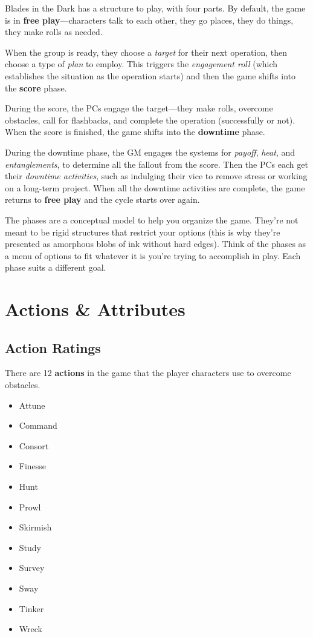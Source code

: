 \documentclass[11pt,oneside]{book}
\begin{document}
Blades in the Dark has a structure to play, with four parts. By default, the game is in \textbf{free play}---characters talk to each other, they go places, they do things, they make rolls as needed.

When the group is ready, they choose a \emph{target} for their next operation, then choose a type of \emph{plan} to employ. This triggers the \emph{engagement roll} (which establishes the situation as the operation starts) and then the game shifts into the \textbf{score} phase.

During the score, the PCs engage the target---they make rolls, overcome obstacles, call for flashbacks, and complete the operation (successfully or not). When the score is finished, the game shifts into the \textbf{downtime} phase.

During the downtime phase, the GM engages the systems for \emph{payoff}, \emph{heat}, and \emph{entanglements}, to determine all the fallout from the score. Then the PCs each get their \emph{downtime activities}, such as indulging their vice to remove stress or working on a long-term project. When all the downtime activities are complete, the game returns to \textbf{free play} and the cycle starts over again.

The phases are a conceptual model to help you organize the game. They’re not meant to be rigid structures that restrict your options (this is why they’re presented as amorphous blobs of ink without hard edges). Think of the phases as a menu of options to fit whatever it is you’re trying to accomplish in play. Each phase suits a different goal.

\chapter{Actions \& Attributes}

\section{Action Ratings}

There are 12 \textbf{actions} in the game that the player characters use to overcome obstacles.

\begin{itemize}
	\item Attune
	\item Command
	\item Consort
	\item Finesse
	\item Hunt
	\item Prowl
	\item Skirmish
	\item Study
	\item Survey
	\item Sway
	\item Tinker
	\item Wreck
\end{itemize}
\end{document}

